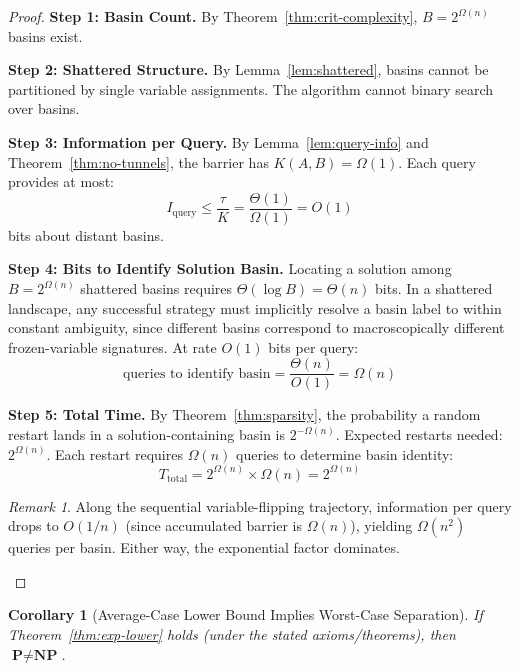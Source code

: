 \documentclass[11pt,a4paper]{article}
\theoremstyle{plain}
\newtheorem{corollary}[theorem]{Corollary}
\theoremstyle{definition}
\theoremstyle{remark}
\newtheorem{remark}[theorem]{Remark}
\newcommand{\NP}{\textbf{NP}}
\newcommand{\PP}{\textbf{P}}
\begin{document}
\begin{proof}
\textbf{Step 1: Basin Count.}
By Theorem~\ref{thm:crit-complexity}, $B = 2^{\Omega(n)}$ basins exist.

\textbf{Step 2: Shattered Structure.}
By Lemma~\ref{lem:shattered}, basins cannot be partitioned by single variable assignments. The algorithm cannot binary search over basins.

\textbf{Step 3: Information per Query.}
By Lemma~\ref{lem:query-info} and Theorem~\ref{thm:no-tunnels}, the barrier has $K(A,B) = \Omega(1)$. Each query provides at most:
\begin{equation}
    I_{\text{query}} \leq \frac{\tau}{K} = \frac{\Theta(1)}{\Omega(1)} = O(1)
\end{equation}
bits about distant basins.

\textbf{Step 4: Bits to Identify Solution Basin.}
Locating a solution among $B = 2^{\Omega(n)}$ shattered basins requires $\Theta(\log B) = \Theta(n)$ bits. In a shattered landscape, any successful strategy must implicitly resolve a basin label to within constant ambiguity, since different basins correspond to macroscopically different frozen-variable signatures. At rate $O(1)$ bits per query:
\begin{equation}
    \text{queries to identify basin} = \frac{\Theta(n)}{O(1)} = \Omega(n)
\end{equation}

\textbf{Step 5: Total Time.}
By Theorem~\ref{thm:sparsity}, the probability a random restart lands in a solution-containing basin is $2^{-\Omega(n)}$. Expected restarts needed: $2^{\Omega(n)}$. Each restart requires $\Omega(n)$ queries to determine basin identity:
\begin{equation}
    T_{\text{total}} = 2^{\Omega(n)} \times \Omega(n) = 2^{\Omega(n)}
\end{equation}

\begin{remark}
Along the sequential variable-flipping trajectory, information per query drops to $O(1/n)$ (since accumulated barrier is $\Omega(n)$), yielding $\Omega(n^2)$ queries per basin. Either way, the exponential factor dominates.
\end{remark}
\end{proof}

\begin{corollary}[Average-Case Lower Bound Implies Worst-Case Separation]
\label{cor:avg-to-sep}
If Theorem~\ref{thm:exp-lower} holds (under the stated axioms/theorems), then $\PP \neq \NP$.
\end{corollary}
\end{document}
